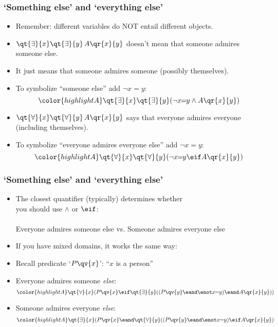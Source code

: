 \begin{frame}
    \frametitle{`Something else' and `everything else'}

\begin{itemize}[<+->]
\item Remember: different variables do NOT entail different objects.
\item $\qt{\exists}{x}\qt{\exists}{y}\,A\qr{x}{y}$ doesn't mean that someone admires
someone else.
\item It just means that someone admires someone (possibly
themselves).
\item To symbolize ``someone else'' add $\lnot x\!\!=\!\!y$:
\[\color{highlightA}
\qt{\exists}{x}\qt{\exists}{y}(\lnot x\!\!=\!\!y \land A\qr{x}{y})\]
\item $\qt{\forall}{x}\qt{\forall}{y}\,A\qr{x}{y}$ says that everyone admires everyone
(including themselves).
\item To symbolize ``everyone admires everyone else'' add $\lnot x\!\!=\!\!y$:
\[\color{highlightA}
\qt{\forall}{x}\qt{\forall}{y}(\lnot x\!\!=\!\!y \eif A\qr{x}{y})\]
\end{itemize}
\end{frame}

\begin{frame}
  \frametitle{`Something else' and `everything else'}

\begin{itemize}[<+->]
\item The closest quantifier (typically) determines whether \\ \qquad you should use $\land$ or $\eif$: \\
 {}\\ 
\footnotesize{\qquad Everyone admires someone else vs. Someone admires everyone else}
\bigskip
\item If you have mixed domains, it works the same way:
\item Recall predicate `$P\qv{x}$': ``$x$ is a person''
\item Everyone admires someone \emph{else}:
\[\color{highlightA}
\qt{\forall}{x}(P\qv{x} \eif \qt{\exists}{y}((P\qv{y} \eand \enot x\!\!=\!\!y) \eand A\qr{x}{y}))
\]
\item Someone admires everyone \emph{else}:
\[\color{highlightA}
\qt{\exists}{x}(P\qv{x} \eand \qt{\forall}{y}((P\qv{y} \eand \enot x\!\!=\!\!y) \eif A\qr{x}{y})
\]
\end{itemize}
\end{frame}

